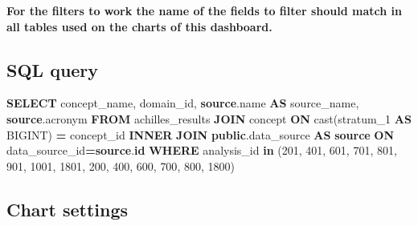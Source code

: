 \documentclass[
]{book}
\newenvironment{Shaded}{\begin{snugshade}}{\end{snugshade}}
\newcommand{\DecValTok}[1]{\textcolor[rgb]{0.00,0.00,0.81}{#1}}
\newcommand{\FunctionTok}[1]{\textcolor[rgb]{0.00,0.00,0.00}{#1}}
\newcommand{\KeywordTok}[1]{\textcolor[rgb]{0.13,0.29,0.53}{\textbf{#1}}}
\newcommand{\NormalTok}[1]{#1}
\newcommand{\OperatorTok}[1]{\textcolor[rgb]{0.81,0.36,0.00}{\textbf{#1}}}
\begin{document}
\textbf{For the filters to work the name of the fields to filter should match in all tables used on the charts of this dashboard.}

\hypertarget{sql-query-22}{%
\subsection{SQL query}\label{sql-query-22}}

\begin{Shaded}
\begin{Highlighting}[]
\KeywordTok{SELECT}\NormalTok{ concept\_name,}
\NormalTok{     domain\_id,}
     \KeywordTok{source}\NormalTok{.name }\KeywordTok{AS}\NormalTok{ source\_name,}
     \KeywordTok{source}\NormalTok{.acronym}
\KeywordTok{FROM}\NormalTok{ achilles\_results}
\KeywordTok{JOIN}\NormalTok{ concept }\KeywordTok{ON} \FunctionTok{cast}\NormalTok{(stratum\_1 }\KeywordTok{AS}\NormalTok{ BIGINT) }\OperatorTok{=}\NormalTok{ concept\_id}
\KeywordTok{INNER} \KeywordTok{JOIN} \KeywordTok{public}\NormalTok{.data\_source }\KeywordTok{AS} \KeywordTok{source} \KeywordTok{ON}\NormalTok{ data\_source\_id}\OperatorTok{=}\KeywordTok{source}\NormalTok{.}\KeywordTok{id}
\KeywordTok{WHERE}\NormalTok{ analysis\_id }\KeywordTok{in}\NormalTok{ (}\DecValTok{201}\NormalTok{, }\DecValTok{401}\NormalTok{, }\DecValTok{601}\NormalTok{, }\DecValTok{701}\NormalTok{, }\DecValTok{801}\NormalTok{, }\DecValTok{901}\NormalTok{, }\DecValTok{1001}\NormalTok{, }\DecValTok{1801}\NormalTok{, }\DecValTok{200}\NormalTok{, }\DecValTok{400}\NormalTok{, }\DecValTok{600}\NormalTok{, }\DecValTok{700}\NormalTok{, }\DecValTok{800}\NormalTok{, }\DecValTok{1800}\NormalTok{)}
\end{Highlighting}
\end{Shaded}

\hypertarget{chart-settings-22}{%
\subsection{Chart settings}\label{chart-settings-22}}
\end{document}

